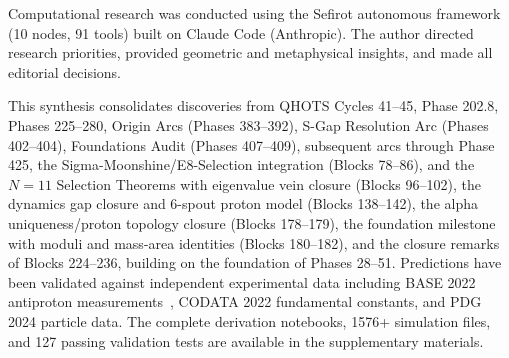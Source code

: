 \documentclass[aps,prd,twocolumn,superscriptaddress,floatfix,nofootinbib]{revtex4-2}
\theoremstyle{definition}
\theoremstyle{remark}
\begin{document}
\begin{acknowledgments}
Computational research was conducted using the Sefirot autonomous framework (10 nodes, 91 tools) built on Claude Code (Anthropic). The author directed research priorities, provided geometric and metaphysical insights, and made all editorial decisions.

This synthesis consolidates discoveries from QHOTS Cycles 41--45, Phase 202.8, Phases 225--280, Origin Arcs (Phases 383--392), S-Gap Resolution Arc (Phases 402--404), Foundations Audit (Phases 407--409), subsequent arcs through Phase 425, the Sigma-Moonshine/E8-Selection integration (Blocks 78--86), and the $N{=}11$ Selection Theorems with eigenvalue vein closure (Blocks 96--102), the dynamics gap closure and 6-spout proton model (Blocks 138--142), the alpha uniqueness/proton topology closure (Blocks 178--179), the foundation milestone with moduli and mass-area identities (Blocks 180--182), and the closure remarks of Blocks 224--236, building on the foundation of Phases 28--51. Predictions have been validated against independent experimental data including BASE 2022 antiproton measurements~\cite{base2022}, CODATA 2022 fundamental constants, and PDG 2024 particle data. The complete derivation notebooks, 1576+ simulation files, and 127 passing validation tests are available in the supplementary materials.
\end{acknowledgments}
\end{document}
